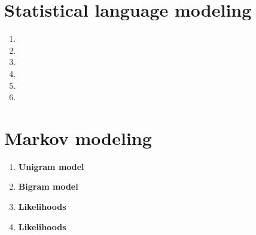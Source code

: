 \documentclass[11]{article}
\begin{document}
\section{Statistical language modeling}
\begin{enumerate}[label=(\alph*)]
\item

\item

\item

\item

\item

\item
\end{enumerate}
\pagebreak

\section{Markov modeling}
\begin{enumerate}[label=(\alph*)]
\item{\textbf{Unigram model}}

\item{\textbf{Bigram model}}

\item{\textbf{Likelihoods}}

\item{\textbf{Likelihoods}}
\end{enumerate}
\end{document}
